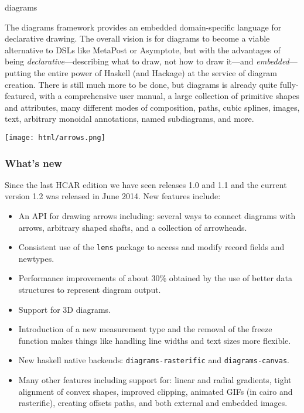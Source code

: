\begin{hcarentry}[updated]{diagrams}

\makeheader

The diagrams framework provides an embedded domain-specific language
for declarative drawing.  The overall vision is for diagrams to become
a viable alternative to DSLs like MetaPost or Asymptote, but with the
advantages of being \emph{declarative}---describing what to draw, not
how to draw it---and \emph{embedded}---putting the entire power of
Haskell (and Hackage) at the service of diagram creation.  There is
still much more to be done, but diagrams is already quite
fully-featured, with a comprehensive user manual, a large collection
of primitive shapes and attributes, many different modes of
composition, paths, cubic splines, images, text, arbitrary monoidal
annotations, named subdiagrams, and more.

\begin{center}
\texttt{[image: html/arrows.png]}
\end{center}

\subsubsection*{What's new}

Since the last HCAR edition we have seen releases 1.0 and 1.1 and 
the current version 1.2 was released in June 2014.
New features include:
\begin{itemize}
\item An API for drawing arrows including: several ways to connect diagrams
  with arrows, arbitrary shaped shafts, and a collection of arrowheads.
\item Consistent use of the \texttt{lens} package to access and modify 
  record fields and newtypes.
\item Performance improvements of about 30\% obtained by the use
  of better data structures to represent diagram output.
\item Support for 3D diagrams.
\item Introduction of a new measurement type and the removal of the
  freeze function makes things like handling line widths and text sizes
   more flexible.
\item New haskell native backends: \texttt{diagrams-rasterific} and
  \texttt{diagrams-canvas}. 
\item Many other features including support for: linear and radial gradients, tight alignment of convex
  shapes, improved clipping, animated GIFs (in cairo and rasterific), creating offsets paths,
  and both external and embedded images.
\end{itemize}



\end{hcarentry}
